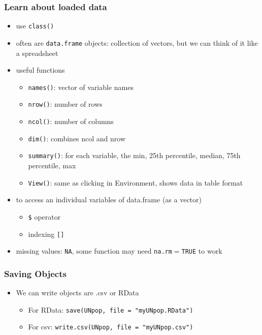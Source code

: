 \documentclass{beamer}
\begin{document}
\begin{frame}
 \frametitle<+->{Learn about loaded data}
 \begin{itemize}
   \item use {\tt class()}
   \item often are {\tt data.frame} objects: collection of vectors, but we can think of it like a spreadsheet
   \item useful functions
     \begin{itemize}
		\item {\tt names()}: vector of variable names
		\item {\tt nrow()}: number of rows
		\item {\tt ncol()}: number of columns
		\item {\tt dim()}: combines ncol and nrow
		\item {\tt summary()}: for each variable, the min, 25th percentile, median, 75th percentile, max
		\item {\tt View()}: same as clicking in Environment, shows data in table format
     \end{itemize}
   \item to access an individual variables of data.frame (as a vector)
     \begin{itemize}
		\item {\tt \$} operator
		\item indexing {\tt []}
     \end{itemize}
   \item missing values: {\tt NA}, some function may need {\tt na.rm$=$TRUE} to work
 \end{itemize}
\end{frame}

\begin{frame}
 \frametitle<+->{Saving Objects}
 \begin{itemize}
   \item We can write objects are .csv or RData
     \begin{itemize}
		\item For RData: {\tt save(UNpop, file = "myUNpop.RData")}
		\item For csv: {\tt write.csv(UNpop, file = "myUNpop.csv")}
     \end{itemize}
 \end{itemize}
\end{frame}
\end{document}
